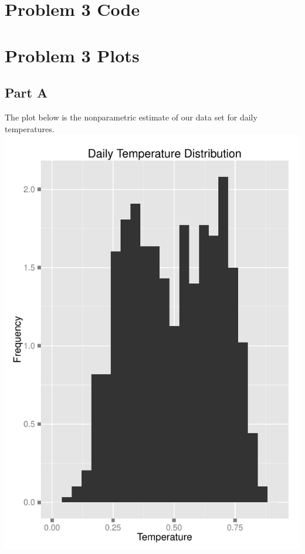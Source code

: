 \documentclass[11pt]{article}
\begin{document}
\section{Problem 3 Code}
\label{sec:problem3code}

\pagebreak

\section{Problem 3 Plots}
\label{sec:problem3plots}
\subsection{Part A}
The plot below is the nonparametric estimate of our data set for daily temperatures. 
\newline
\label{sec:problem3aplot}
\includegraphics{Problem3A.pdf}
\newline
\pagebreak
\end{document}

